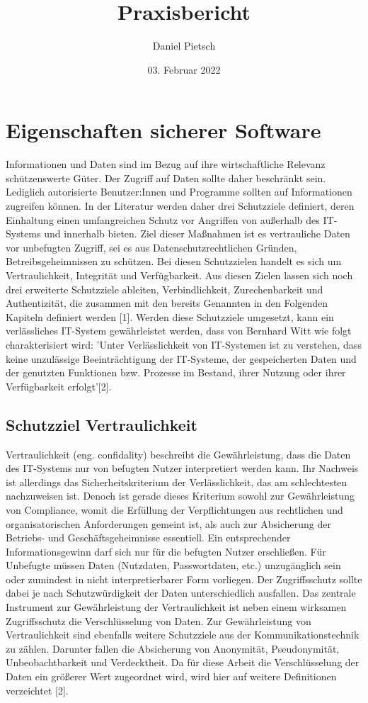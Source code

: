 \documentclass[a4paper, 11pt]{article}
\title{Praxisbericht}
\author{Daniel Pietsch}
\date{03. Februar 2022}
\begin{document}
\section{Eigenschaften sicherer Software}
Informationen und Daten sind im Bezug auf ihre wirtschaftliche Relevanz schützenswerte Güter. Der Zugriff auf Daten sollte daher beschränkt sein. Lediglich autorisierte Benutzer:Innen und Programme sollten auf Informationen zugreifen können. In der Literatur werden daher drei Schutzziele definiert, deren Einhaltung einen umfangreichen Schutz vor Angriffen von außerhalb des IT-Systems und innerhalb bieten. Ziel dieser Maßnahmen ist es vertrauliche Daten vor unbefugten Zugriff, sei es aus Datenschutzrechtlichen Gründen, Betreibsgeheimnissen zu schützen. Bei diesen Schutzzielen handelt es sich um Vertraulichkeit, Integrität und Verfügbarkeit. Aus diesen Zielen lassen sich noch drei erweiterte Schutzziele ableiten, Verbindlichkeit, Zurechenbarkeit und Authentizität, die zusammen mit den bereits Genannten in den Folgenden Kapiteln definiert werden [1]. Werden diese Schutzziele umgesetzt, kann ein verlässliches IT-System gewährleistet werden, dass von Bernhard Witt wie folgt charakterisiert wird: 'Unter Verlässlichkeit von IT-Systemen ist zu verstehen, dass keine unzulässige Beeinträchtigung der IT-Systeme, der gespeicherten Daten und der genutzten Funktionen bzw. Prozesse im Bestand, ihrer Nutzung oder ihrer Verfügbarkeit erfolgt'[2].

\subsection{Schutzziel Vertraulichkeit}
Vertraulichkeit (eng. confidality) beschreibt die Gewährleistung, dass die Daten des IT-Systems nur von befugten Nutzer interpretiert werden kann. Ihr Nachweis ist allerdings das Sicherheitskriterium der Verlässlichkeit, das am schlechtesten nachzuweisen ist. Denoch ist gerade dieses Kriterium sowohl zur Gewährleistung von Compliance, womit die Erfüllung der Verpflichtungen aus rechtlichen und organisatorischen Anforderungen gemeint ist, als auch zur Absicherung der Betriebs- und Geschäftsgeheimnisse essentiell. Ein entsprechender Informationsgewinn darf sich nur für die befugten Nutzer erschließen. Für Unbefugte müssen Daten (Nutzdaten, Passwortdaten, etc.) unzugänglich sein oder zumindest in nicht interpretierbarer Form vorliegen. Der Zugriffsschutz sollte dabei je nach Schutzwürdigkeit der Daten unterschiedlich ausfallen. Das zentrale Instrument zur Gewährleistung der Vertraulichkeit ist neben einem wirksamen Zugriffsschutz die Verschlüsselung von Daten. Zur Gewährleistung von Vertraulichkeit sind ebenfalls weitere Schutzziele aus der Kommunikationstechnik zu zählen. Darunter fallen die Absicherung von Anonymität, Pseudonymität, Unbeobachtbarkeit und Verdecktheit. Da für diese Arbeit die Verschlüsselung der Daten ein größerer Wert zugeordnet wird, wird hier auf weitere Definitionen verzeichtet [2].
\end{document}
